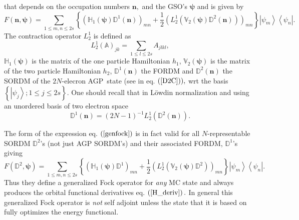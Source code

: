 \documentclass[titlepage]{article}%
\begin{document}
that depends on the occupation numbers $\bm{n,}$ and the GSO's $\bm{\psi}$ and
is given by
\begin{equation}
F\left(  \bm{n,\psi}\right)  =\sum_{1\leq m,n\leq2s}\left\{  \left(
\mathbb{H}_{1}\left(  \bm{\psi}\right)  \mathbb{D}^{1}\left(  \bm{n}\right)
\right)  _{mn}+\frac{1}{2}\left(  L_{2}^{1}\left(  \mathbb{V}_{2}\left(
\bm{\psi}\right)  \mathbb{D}^{2}\left(  \bm{n}\right)  \right)  \right)
_{mn}\right\}  \left\vert \psi_{m}\right\rangle \left\langle \psi
_{n}\right\vert . \label{genfock}%
\end{equation}
The contraction operator $L_{2}^{1}$ is defined as
\begin{equation}
L_{2}^{1}\left(  \mathbb{A}\right)  _{jk}=\sum_{1\leq l\leq2s}A_{jlkl},
\end{equation}
$\mathbb{H}_{1}\left(  \bm{\psi}\right)  $ is the matrix of the one particle
Hamiltonian $h_{1}$, $\mathbb{V}_{2}\left(  \bm{\psi}\right)  $ is the matrix
of the two particle Hamiltonian $h_{2}$, $\mathbb{D}^{1}\left(  \bm{n}\right)
$ the FORDM and $\mathbb{D}^{2}\left(  \bm{n}\right)  $ the SORDM of the
$2N$-elecron AGP\ state (see in eq. $\left(  \ref{D2C}\right)  ),$ wrt the
basis $\left\{  \left\vert \psi_{j}\right\rangle ;1\leq j\leq2s\right\}  .$
One should recall that in L\"{o}wdin normalization and using an unordered
basis of two electron space
\begin{equation}
\mathbb{D}^{1}\left(  \bm{n}\right)  =\left(  2N-1\right)  ^{-1}L_{2}%
^{1}\left(  \mathbb{D}^{2}\left(  \bm{n}\right)  \right)  .
\end{equation}


The form of the expression eq. $\left(  \ref{genfock}\right)  $ is in fact
valid for all $N$-representable SORDM $\mathbb{D}^{2}$'s (not just AGP
SORDM's) and their associated FORDM, $\mathbb{D}^{1}$'s giving
\begin{equation}
F\left(  \mathbb{D}^{2}\bm{,\psi}\right)  =\sum_{1\leq m,n\leq2s}\left\{
\left(  \mathbb{H}_{1}\left(  \bm{\psi}\right)  \mathbb{D}^{1}\right)
_{mn}+\frac{1}{2}\left(  L_{2}^{1}\left(  \mathbb{V}_{2}\left(
\bm{\psi }\right)  \mathbb{D}^{2}\right)  \right)  _{mn}\right\}  \left\vert
\psi_{m}\right\rangle \left\langle \psi_{n}\right\vert .
\end{equation}
Thus they define a generalized Fock operator for \emph{any }MC state and
always produces the orbital functional derivatives eq. $\left(  \ref{H_deriv}%
\right)  .$ In general this generalized Fock operator is \emph{not }self
adjoint\emph{ }unless the state that it is based on fully optimizes the energy functional.
\end{document}

